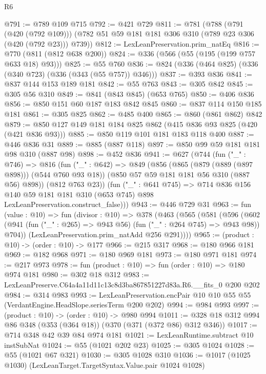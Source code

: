 \begin{lexlean}{R6}
\begin{coremodule}
@791 := @789 @109 @715
@792 := @421 @729
@811 := @781
    (@788
      (@791 (@420 (@792 @109)))
      (@782 @51 @59 @181 @181 @306 @310 (@789 @23 @306 (@420 (@792 @23))) @739))
@812 := LexLeanPreservation.prim_natEq
@816 := @770 (@811 (@812 @638 @200))
@824 := @336 (@566 (@55 (@195 (@199 @757 @633 @18) @93)))
@825 := @55 @760
@836 := @824 (@336 (@464 @825) (@336 (@340 @723) (@336 (@343 (@55 @757)) @346)))
@837 := @393 @836
@841 := @837 @144 @153 @189 @181
@842 := @55 @763
@843 := @305 @842
@845 := @305 @56 @310
@849 := @841 (@843 @845) (@653 @765)
@850 := @406 @836
@856 := @850 @151 @60 @187 @183 @842 @845
@860 := @837 @114 @150 @185 @181
@861 := @305 @825
@862 := @485 @400
@865 := @860 (@861 @862) @842
@879 := @850 @127 @149 @181 @184 @825 @862 (@415 @836 @93 @825 (@420 (@421 @836 @93)))
@885 := @850 @119 @101 @181 @183 @118 @400
@887 := @446 @836 @31
@889 := @885 (@887 @118)
@897 := @850 @99 @59 @181 @181 @98 @310 (@887 @98)
@898 := @452 @836
@941 := @627
    (@744
      (fun ("_" : @746) =>
      @816
        (fun ("_" : @642) =>
        @849
          (@856
            (@865 (@879 (@889 (@897 @898))) (@544 @760 @93 @18))
            (@850 @57 @59 @181 @181 @56 @310 (@887 @56) @898))
          (@812 @763 @23))
        (fun ("_" : @641 @745) =>
        @714
          @836
          @156
          @140
          @59
          @181
          @181
          @310
          (@653 @745)
          @898
          LexLeanPreservation.construct_false)))
@943 := @446 @729 @31
@963 := fun (value : @10) =>
  fun (divisor : @10) =>
  @378
    (@463
      (@565
        (@581
          (@596
            (@602 (@941 (fun ("_" : @265) => @943 @56) (fun ("_" : @264 @745) => @943 @98)) @704))
          (LexLeanPreservation.prim_natAdd @256 @291))))
@965 := (product : @10) -> (order : @10) -> @177
@966 := @215 @317
@968 := @180 @966 @181
@969 := @182 @968
@971 := @180 @969 @181
@973 := @180 @971 @181
@974 := @217 @973
@978 := fun (product : @10) => fun (order : @10) => @180 @974 @181
@980 := @302 @18 @312
@983 := LexLeanPreserve.C64a4a11d11c13c8d3ba867851227d83a.R6.__fits_0 @200 @202
@984 := @314 @983
@993 := LexLeanPreservation.encPair @10 @10 @55 @55 (VerdantEngine.HeadSlope.seriesTerm @200 @202)
@994 := @984 @993
@997 := (product : @10) -> (order : @10) -> @980 @994
@1011 := @328 @18 @312 @994 @86 @348 (@353 (@364 @18)) (@370 (@371 (@372 @86) @312 @346))
@1017 := @714 @348 @42 @39 @84 @974 @181
@1021 := LexLeanRuntime.subtract @10 instSubNat
@1024 := @55 (@1021 @202 @23)
@1025 := @305 @1024
@1028 := @55 (@1021 @67 @321)
@1030 := @305 @1028 @310
@1036 := @1017 (@1025 @1030) (LexLeanTarget.TargetSyntax.Value.pair @1024 @1028)

\end{coremodule}
\end{lexlean}
